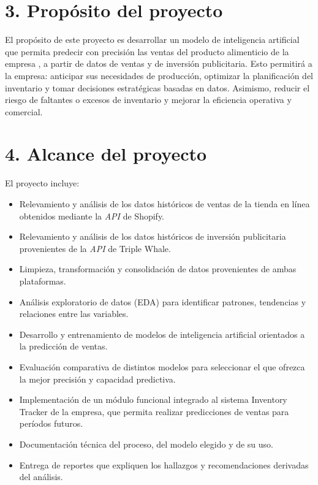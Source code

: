 \documentclass[
11pt, %
]{charter}
\begin{document}
\section{3. Propósito del proyecto}
\label{sec:proposito}

El propósito de este proyecto es desarrollar un modelo de inteligencia artificial que permita predecir con precisión las ventas del producto alimenticio de la empresa \empclientename, 
a partir de datos de ventas y de inversión publicitaria. 
Esto permitirá a la empresa: anticipar sus necesidades de producción, optimizar la planificación del inventario y tomar decisiones estratégicas basadas en datos. 
Asimismo, reducir el riesgo de faltantes o excesos de inventario y mejorar la eficiencia operativa y comercial.

\section{4. Alcance del proyecto}
\label{sec:alcance}

El proyecto incluye:
\begin{itemize}
\item Relevamiento y análisis de los datos históricos de ventas de la tienda en línea obtenidos mediante la \textit{API} de Shopify.
\item Relevamiento y análisis de los datos históricos de inversión publicitaria provenientes de la \textit{API} de Triple Whale.
\item Limpieza, transformación y consolidación de datos provenientes de ambas plataformas.
\item Análisis exploratorio de datos (EDA) para identificar patrones, tendencias y relaciones entre las variables.
\item Desarrollo y entrenamiento de modelos de inteligencia artificial orientados a la predicción de ventas.
\item Evaluación comparativa de distintos modelos para seleccionar el que ofrezca la mejor precisión y capacidad predictiva.
\item Implementación de un módulo funcional integrado al sistema Inventory Tracker de la empresa, que permita realizar predicciones de ventas para períodos futuros.
\item Documentación técnica del proceso, del modelo elegido y de su uso.
\item Entrega de reportes que expliquen los hallazgos y recomendaciones derivadas del análisis.
\end{itemize}
\end{document}
